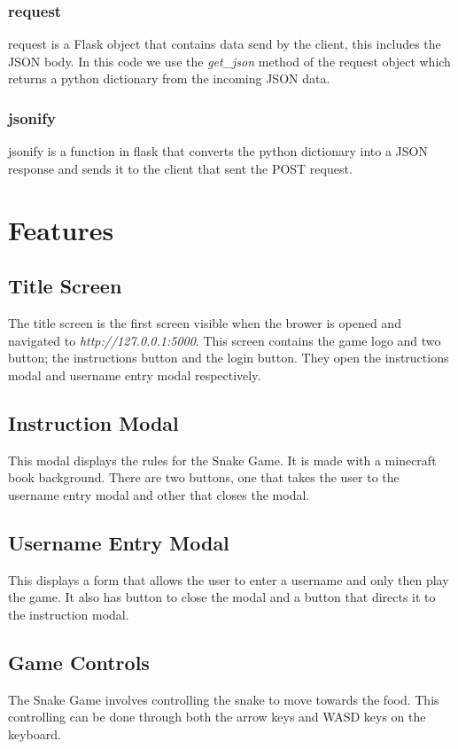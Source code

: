 \documentclass[12pt, letterpaper]{article}
\begin{document}
\subsubsection*{request}

request is a Flask object that contains data send by the client, this includes the JSON body. In this code we use the \textit{get\_json} method of the request object which returns a python dictionary from the incoming JSON data.

\subsubsection*{jsonify}

jsonify is a function in flask that converts the python dictionary into a JSON response and sends it to the client that sent the POST request.

\section{Features}
\subsection{Title Screen}
The title screen is the first screen visible when the brower is opened and navigated to \textit{http://127.0.0.1:5000}. This screen contains the game logo and two button; the instructions button and the login button. They open the instructions modal and username entry modal respectively.

\subsection{Instruction Modal}
This modal displays the rules for the Snake Game. It is made with a minecraft book background. There are two buttons, one that takes the user to the username entry modal and other that closes the modal.

\subsection{Username Entry Modal}
This displays a form that allows the user to enter a username and only then play the game. It also has button to close the modal and a button that directs it to the instruction modal.

\subsection{Game Controls}
The Snake Game involves controlling the snake to move towards the food. This controlling can be done through both the arrow keys and WASD keys on the keyboard.
\end{document}
